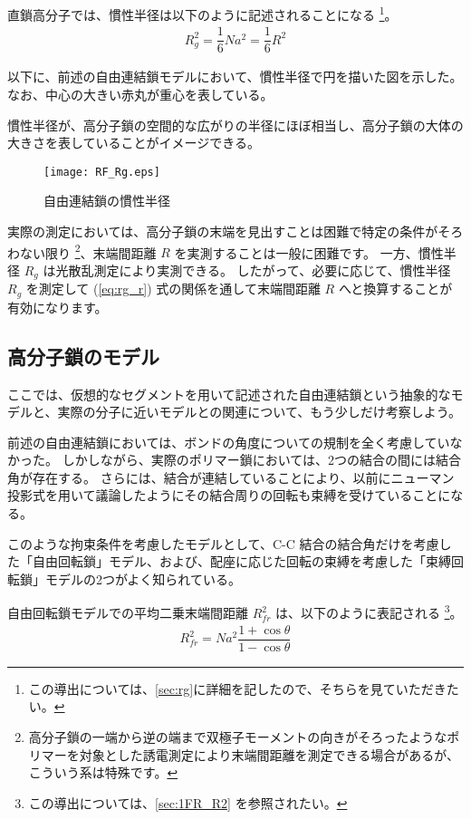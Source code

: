 \documentclass[a4paper,11pt]{jlreq}
\begin{document}
直鎖高分子では、慣性半径は以下のように記述されることになる
\footnote
{
この導出については、\ref{sec:rg}に詳細を記したので、そちらを見ていただきたい。
}。
\begin{align}
R_g^2 = \dfrac{1}{6}Na^2 = \dfrac{1}{6} R^2
\label{eq:rg_r}
\end{align}

以下に、前述の自由連結鎖モデルにおいて、慣性半径で円を描いた図を示した。
なお、中心の大きい赤丸が重心を表している。

慣性半径が、高分子鎖の空間的な広がりの半径にほぼ相当し、高分子鎖の大体の大きさを表していることがイメージできる。
\begin{figure}[htb]
 \centering
	\texttt{[image: RF\_Rg.eps]}
	\caption{自由連結鎖の慣性半径}
	\label{fig: RF_Rg}
\end{figure}

実際の測定においては、高分子鎖の末端を見出すことは困難で特定の条件がそろわない限り
\footnote
{
高分子鎖の一端から逆の端まで双極子モーメントの向きがそろったようなポリマーを対象とした誘電測定により末端間距離を測定できる場合があるが、こういう系は特殊です。
}、末端間距離 $R$ を実測することは一般に困難です。
一方、慣性半径 $R_g$ は光散乱測定により実測できる。
したがって、必要に応じて、慣性半径 $R_g$ を測定して (\ref{eq:rg_r}) 式の関係を通して末端間距離 $R$ へと換算することが有効になります。

\subsection{高分子鎖のモデル}

ここでは、仮想的なセグメントを用いて記述された自由連結鎖という抽象的なモデルと、実際の分子に近いモデルとの関連について、もう少しだけ考察しよう。

前述の自由連結鎖においては、ボンドの角度についての規制を全く考慮していなかった。
しかしながら、実際のポリマー鎖においては、2つの結合の間には結合角が存在する。
さらには、結合が連結していることにより、以前にニューマン投影式を用いて議論したようにその結合周りの回転も束縛を受けていることになる。

このような拘束条件を考慮したモデルとして、C-C 結合の結合角だけを考慮した「自由回転鎖」モデル、および、配座に応じた回転の束縛を考慮した「束縛回転鎖」モデルの2つがよく知られている。

自由回転鎖モデルでの平均二乗末端間距離 $R_{fr}^2$ は、以下のように表記される
\footnote
{
この導出については、\ref{sec:1FR_R2} を参照されたい。
}。
\begin{align}
R_{fr}^2 = Na^2 \dfrac{1+\cos \theta}{1-\cos \theta}
\label{eq:r2_free}
\end{align}
\end{document}

